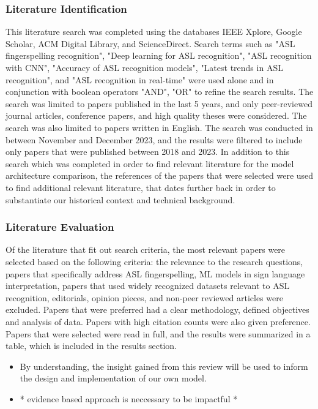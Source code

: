 \subsubsection{Literature Identification}
This literature search was completed using the databases IEEE Xplore, Google Scholar, ACM Digital Library, and ScienceDirect. Search terms such as "ASL fingerspelling recognition", "Deep learning for ASL recognition",  "ASL recognition with CNN", "Accuracy of ASL recognition models", "Latest trends in ASL recognition", and "ASL recognition in real-time" were used alone and in conjunction with boolean operators "AND", "OR" to refine the search results. The search was limited to papers published in the last 5 years, and only peer-reviewed journal articles, conference papers, and high quality theses were considered. The search was also limited to papers written in English. The search was conducted in between November and December 2023, and the results were filtered to include only papers that were published between 2018 and 2023.
In addition to this search which was completed in order to find relevant literature for the model architecture comparison, the references of the papers that were selected were used to find additional relevant literature, that dates further back in order to substantiate our historical context and technical background.
\subsubsection{Literature Evaluation}
Of the literature that fit out search criteria, the most relevant papers were selected based on the following criteria: the relevance to the research questions, papers that specifically address ASL fingerspelling, ML models in sign language interpretation, papers that used widely recognized datasets relevant to ASL recognition, editorials, opinion pieces, and non-peer reviewed articles were excluded. Papers that were preferred had a clear methodology, defined objectives and analysis of data. Papers with high citation counts were also given preference. Papers that were selected were read in full, and the results were summarized in a table, which is included in the results section.

\begin{itemize}
    \item By understanding, the insight gained from this review will be used to inform the design and implementation of our own model.
    \item * evidence based approach is neccessary to be impactful *
\end{itemize}

